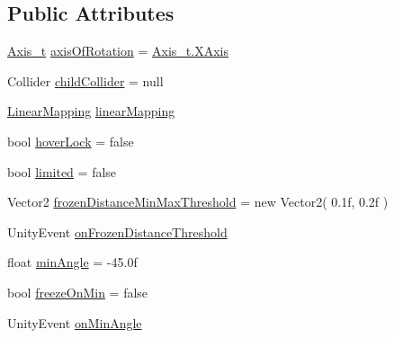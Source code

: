 \subsection*{Public Attributes}
\begin{DoxyCompactItemize}
\item 
\mbox{\hyperlink{class_valve_1_1_v_r_1_1_interaction_system_1_1_circular_drive_a9a0227d59ad0af7a3422fcab9798b5dd}{Axis\+\_\+t}} \mbox{\hyperlink{class_valve_1_1_v_r_1_1_interaction_system_1_1_circular_drive_a2f9b36dd2c045b2f4bc219f44a8f11da}{axis\+Of\+Rotation}} = \mbox{\hyperlink{class_valve_1_1_v_r_1_1_interaction_system_1_1_circular_drive_a9a0227d59ad0af7a3422fcab9798b5ddaf37dd7d4e7b7d1020e931480f0d8f168}{Axis\+\_\+t.\+X\+Axis}}
\item 
Collider \mbox{\hyperlink{class_valve_1_1_v_r_1_1_interaction_system_1_1_circular_drive_a0011853018f4888638b3da5d80a9ea4f}{child\+Collider}} = null
\item 
\mbox{\hyperlink{class_valve_1_1_v_r_1_1_interaction_system_1_1_linear_mapping}{Linear\+Mapping}} \mbox{\hyperlink{class_valve_1_1_v_r_1_1_interaction_system_1_1_circular_drive_a1cbb357fea44834490a548d1c0aabe38}{linear\+Mapping}}
\item 
bool \mbox{\hyperlink{class_valve_1_1_v_r_1_1_interaction_system_1_1_circular_drive_a6e182eb36a646459a16013762119cb26}{hover\+Lock}} = false
\item 
bool \mbox{\hyperlink{class_valve_1_1_v_r_1_1_interaction_system_1_1_circular_drive_a791a378c083be76541596cf8f0114f65}{limited}} = false
\item 
Vector2 \mbox{\hyperlink{class_valve_1_1_v_r_1_1_interaction_system_1_1_circular_drive_a515609613e137b1444f0401aec533168}{frozen\+Distance\+Min\+Max\+Threshold}} = new Vector2( 0.\+1f, 0.\+2f )
\item 
Unity\+Event \mbox{\hyperlink{class_valve_1_1_v_r_1_1_interaction_system_1_1_circular_drive_aa5f8b17da9994727affd36aecd5d638a}{on\+Frozen\+Distance\+Threshold}}
\item 
float \mbox{\hyperlink{class_valve_1_1_v_r_1_1_interaction_system_1_1_circular_drive_a94c3a6e446bd4b264da0635cef83f240}{min\+Angle}} = -\/45.\+0f
\item 
bool \mbox{\hyperlink{class_valve_1_1_v_r_1_1_interaction_system_1_1_circular_drive_a92e4f8585a4bbe701388468402167461}{freeze\+On\+Min}} = false
\item 
Unity\+Event \mbox{\hyperlink{class_valve_1_1_v_r_1_1_interaction_system_1_1_circular_drive_ac0e1d669f1f18a4229c18f09a843af27}{on\+Min\+Angle}}

\end{DoxyCompactItemize}
